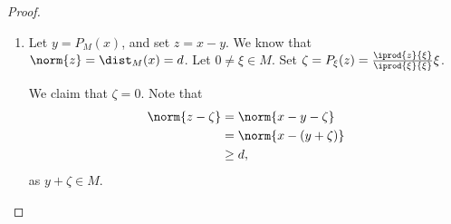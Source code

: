 \documentclass[10pt]{mypackage}
\begin{document}
\begin{proof}\hfill
  \begin{enumerate}[(1)]
    \item Let $y = P_M(x)$, and set $z = x-y$. We know that $\norm{z} = \dist_{M}(x) = d$. Let $0\neq \xi\in M$. Set $\zeta = P_{\xi}(z) = \frac{ \iprod{z}{\xi} }{ \iprod{\xi}{\xi} }\xi$.\newline

      We claim that $\zeta = 0$. Note that
      \begin{align*}
        \norm{z - \zeta}&= \norm{x - y-\zeta}\\
                        &= \norm{x - \left(y + \zeta\right)}\\
                        &\geq d,
      \end{align*}
      as $y + \zeta \in M$.\newline


\end{enumerate}
\end{proof}
\end{document}

